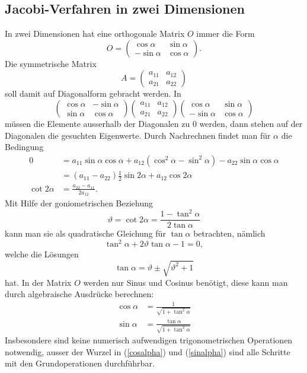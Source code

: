 \subsection{Jacobi-Verfahren in zwei Dimensionen\label{jacobi2d}}
In zwei Dimensionen hat eine orthogonale Matrix $O$ immer die
Form
\[
O=\begin{pmatrix}\cos\alpha&\sin\alpha\\-\sin\alpha&\cos\alpha\end{pmatrix}.
\]
Die symmetrische Matrix
\[
A=\begin{pmatrix}a_{11}&a_{12}\\a_{21}&a_{22}\end{pmatrix}
\]
soll damit auf Diagonalform gebracht werden.
In
\[
\begin{pmatrix}
\cos\alpha&-\sin\alpha\\
\sin\alpha& \cos\alpha
\end{pmatrix}
\begin{pmatrix}
a_{11}&a_{12}\\
a_{21}&a_{22}
\end{pmatrix}
\begin{pmatrix}
 \cos\alpha&\sin\alpha\\
-\sin\alpha&\cos\alpha
\end{pmatrix}
\]
müssen die Elemente ausserhalb der Diagonalen zu $0$ werden, dann
stehen auf der Diagonalen die gesuchten Eigenwerte.
Durch Nachrechnen findet man für $\alpha$ die Bedingung
\begin{align*}
0&=
a_{11}\sin\alpha\cos\alpha +a_{12}(\cos^2\alpha-\sin^2\alpha)
-a_{22}\sin\alpha\cos\alpha
\\
&=
(a_{11}-a_{22})
\frac12\sin2\alpha+a_{12}\cos2\alpha\\
\cot2\alpha&=\frac{a_{22}-a_{11}}{2a_{12}}.
\end{align*}
Mit Hilfe der goniometrischen Beziehung
\[
\vartheta=\cot2\alpha = \frac{1-\tan^2\alpha}{2\tan\alpha}
\]
kann man sie als quadratische Gleichung für $\tan\alpha$ betrachten, nämlich
\[
\tan^2\alpha+2\vartheta\tan\alpha-1=0,
\]
welche die Lösungen
\[
\tan\alpha=\vartheta\pm\sqrt{\vartheta^2+1}
\]
hat. In der Matrix $O$ werden nur Sinus und Cosinus benötigt, diese
kann man durch algebraische Ausdrücke berechnen:
\begin{align}
\cos\alpha&=\frac1{\sqrt{1+\tan^2\alpha}}\label{cosalpha}\\
\sin\alpha&=\frac{\tan\alpha}{\sqrt{1+\tan^2\alpha}}\label{sinalpha}
\end{align}
Insbesondere sind keine numerisch aufwendigen trigonometrischen Operationen
notwendig, ausser der Wurzel in (\ref{cosalpha}) und (\ref{sinalpha})
sind alle Schritte mit den Grundoperationen durchführbar.

